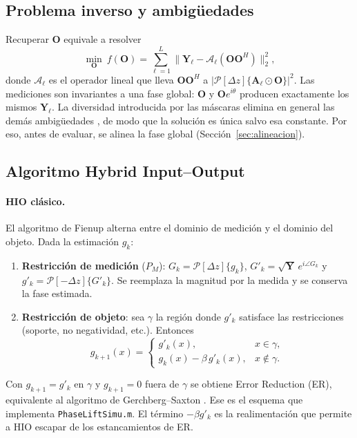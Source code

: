 \documentclass[11pt,a4paper]{article}
\newcommand{\Prop}{\mathcal{P}[\Delta z]}
\newcommand{\PropInv}{\mathcal{P}[-\Delta z]}
\newcommand{\Obj}{\mathbf{O}}
\newcommand{\hio}{\textsc{HIO}}
\newcommand{\er}{\textsc{ER}}
\begin{document}
\subsection{Problema inverso y ambigüedades}

Recuperar $\Obj$ equivale a resolver
\begin{equation}
    \min_{\Obj}\ f(\Obj)=\sum_{\ell=1}^{L}\big\|\mathbf{Y}_\ell-\mathcal{A}_\ell(\Obj\Obj^{H})\big\|_2^2,
    \label{eq:inverso}
\end{equation}
donde $\mathcal{A}_\ell$ es el operador lineal que lleva $\Obj\Obj^H$ a $|\Prop\{\mathbf{A}_\ell\odot\Obj\}|^2$. Las mediciones son invariantes a una fase global: $\Obj$ y $\Obj e^{i\theta}$ producen exactamente los mismos $\mathbf{Y}_\ell$. La diversidad introducida por las máscaras elimina en general las demás ambigüedades \cite{candes2015coded}, de modo que la solución es única salvo esa constante. Por eso, antes de evaluar, se alinea la fase global (Sección~\ref{sec:alineacion}).

\subsection{Algoritmo Hybrid Input--Output}
\label{sec:hio}

\paragraph{\hio{} clásico.} El algoritmo de Fienup \cite{fienup1982} alterna entre el dominio de medición y el dominio del objeto. Dada la estimación $g_k$:
\begin{enumerate}[label=\arabic*.]
    \item \textbf{Restricción de medición} ($P_M$): $G_k=\Prop\{g_k\}$, $G'_k=\sqrt{\mathbf{Y}}\,e^{i\angle G_k}$ y $g'_k=\PropInv\{G'_k\}$. Se reemplaza la magnitud por la medida y se conserva la fase estimada.
    \item \textbf{Restricción de objeto}: sea $\gamma$ la región donde $g'_k$ satisface las restricciones (soporte, no negatividad, etc.). Entonces
    \begin{equation}
        g_{k+1}(x)=\begin{cases}
            g'_k(x), & x\in\gamma,\\
            g_k(x)-\beta\,g'_k(x), & x\notin\gamma.
        \end{cases}
        \label{eq:hio-clasico}
    \end{equation}
\end{enumerate}
Con $g_{k+1}=g'_k$ en $\gamma$ y $g_{k+1}=0$ fuera de $\gamma$ se obtiene Error Reduction (\er{}), equivalente al algoritmo de Gerchberg--Saxton \cite{gerchberg1972}. Ese es el esquema que implementa \texttt{PhaseLiftSimu.m}. El término $-\beta g'_k$ es la realimentación que permite a \hio{} escapar de los estancamientos de \er{}.
\end{document}
